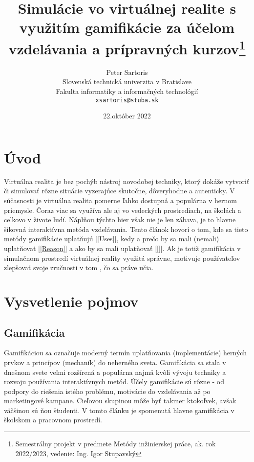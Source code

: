 \documentclass[10pt,slovak,a4paper]{article}
\title{Simulácie vo virtuálnej realite s využitím gamifikácie za účelom vzdelávania a prípravných kurzov\thanks{Semestrálny projekt v predmete Metódy inžinierskej práce, ak. rok 2022/2023, vedenie: Ing. Igor Stupavský}}
\author{Peter Sartoris\\[2pt]
	{\small Slovenská technická univerzita v Bratislave}\\
	{\small Fakulta informatiky a informačných technológií}\\
	{\small \texttt{xsartoris@stuba.sk}}
	}
\date{\small 22.október 2022}
\begin{document}
\maketitle


\section{Úvod} \label{Abstract}

Virtuálna realita je bez pochýb nástroj novodobej techniky, ktorý dokáže vytvoriť či simulovať rôzne situácie vyzerajúce skutočne, dôveryhodne a autenticky.
V súčasnosti je virtuálna realita pomerne ľahko dostupná a populárna v hernom priemysle. Čoraz viac sa využíva ale aj vo vedeckých prostrediach, na školách a celkovo v živote ľudí. 
Náplňou týchto hier však nie je len zábava, je to hlavne šikovná interaktívna metóda vzdelávania.
Tento článok hovorí o tom, kde sa tieto metódy gamifikácie uplatňujú [\ref{Uses}], kedy a prečo by sa mali (nemali) uplatňovať [\ref{Reason}] a ako by sa mali uplatňovať [\ref{}]. 
Ak je totiž gamifikácia v simulačnom prostredí  virtuálnej reality využitá správne, motivuje používateľov zlepšovať svoje zručnosti v tom , čo sa práve učia.


\section{Vysvetlenie pojmov} \label{Terms}

\subsection{Gamifikácia} \label{Gamification:gamification}

Gamifikáciou sa označuje moderný termín uplatňovania (implementácie) herných prvkov a princípov (mechaník) do neherného sveta.
 Gamifikácia sa stala v dnešnom svete veľmi rozšírená a populárna najmä kvôli vývoju techniky a rozvoju používania interaktívnych metód.
Účely gamifikácie sú rôzne - od podpory do riešenia istého problému, motivácie do vzdelávania až po marketingové kampane. 
Cieľovou skupinou môže byť takmer ktokoľvek, avšak väčšinou sú ňou študenti. V tomto článku je spomenutá hlavne gamifikácia v školskom a pracovnom prostredí. \newline \newline
\end{document}
